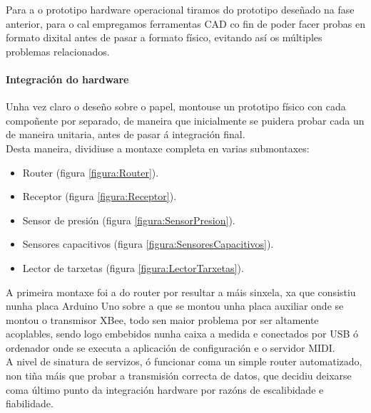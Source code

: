   Para a o prototipo hardware operacional tiramos do prototipo deseñado na fase
  anterior, para o cal empregamos ferramentas CAD co fin de poder facer probas
  en formato dixital antes de pasar a formato físico, evitando así os múltiples
  problemas relacionados.

   \paragraph{Integración do hardware}
   
   Unha vez claro o deseño sobre o papel, montouse un prototipo físico con cada
   compoñente por separado, de maneira que inicialmente se puidera probar cada
   un de maneira unitaria, antes de pasar á integración final. \\
   
   Desta maneira, dividiuse a montaxe completa en varias submontaxes:
   
   \begin{itemize}
    \item Router (figura \ref{figura:Router}).
    \item Receptor (figura \ref{figura:Receptor}).
    \item Sensor de presión (figura \ref{figura:SensorPresion}).
    \item Sensores capacitivos (figura \ref{figura:SensoresCapacitivos}).
    \item Lector de tarxetas (figura \ref{figura:LectorTarxetas}).
   \end{itemize}
   
   A primeira montaxe foi a do router por resultar a máis sinxela, xa que
   consistiu nunha placa Arduino Uno sobre a que se montou unha placa auxiliar
   onde se montou o transmisor XBee, todo sen maior problema por ser altamente
   acoplables, sendo logo embebidos nunha caixa a medida e conectados por USB
   ó ordenador onde se executa a aplicación de configuración e o servidor
   MIDI. \\
   
   A nivel de sinatura de servizos, ó funcionar coma un simple router
   automatizado, non tiña máis que probar a transmisión correcta de datos, que
   decidiu deixarse coma último punto da integración hardware por razóns de
   escalibidade e fiabilidade. \\
   
